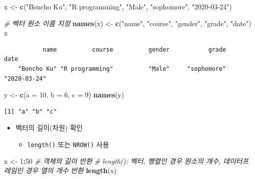 \documentclass[
  11pt,
]{krantz}
\newenvironment{Shaded}{\begin{snugshade}}{\end{snugshade}}
\newcommand{\CommentTok}[1]{\textcolor[rgb]{0.37,0.37,0.37}{\textit{#1}}}
\newcommand{\DataTypeTok}[1]{\textcolor[rgb]{0.27,0.27,0.27}{#1}}
\newcommand{\DecValTok}[1]{\textcolor[rgb]{0.06,0.06,0.06}{#1}}
\newcommand{\KeywordTok}[1]{\textcolor[rgb]{0.27,0.27,0.27}{\textbf{#1}}}
\newcommand{\NormalTok}[1]{#1}
\newcommand{\OperatorTok}[1]{\textcolor[rgb]{0.43,0.43,0.43}{\textbf{#1}}}
\newcommand{\StringTok}[1]{\textcolor[rgb]{0.5,0.5,0.5}{#1}}
\providecommand{\tightlist}{%
  \setlength{\itemsep}{0pt}\setlength{\parskip}{0pt}}
\begin{document}
\begin{Shaded}
\begin{Highlighting}[]
\NormalTok{x <-}\StringTok{ }\KeywordTok{c}\NormalTok{(}\StringTok{"Boncho Ku"}\NormalTok{, }\StringTok{"R programming"}\NormalTok{, }\StringTok{"Male"}\NormalTok{, }\StringTok{"sophomore"}\NormalTok{, }\StringTok{"2020-03-24"}\NormalTok{)}

\CommentTok{# 벡터 원소 이름 지정}
\KeywordTok{names}\NormalTok{(x) <-}\StringTok{ }\KeywordTok{c}\NormalTok{(}\StringTok{"name"}\NormalTok{, }\StringTok{"course"}\NormalTok{, }\StringTok{"gender"}\NormalTok{, }\StringTok{"grade"}\NormalTok{, }\StringTok{"date"}\NormalTok{) }
\NormalTok{x}
\end{Highlighting}
\end{Shaded}

\begin{verbatim}
           name          course          gender           grade            date 
    "Boncho Ku" "R programming"          "Male"     "sophomore"    "2020-03-24" 
\end{verbatim}

\begin{Shaded}
\begin{Highlighting}[]
\NormalTok{y <-}\StringTok{ }\KeywordTok{c}\NormalTok{(}\DataTypeTok{a =} \DecValTok{10}\NormalTok{, }\DataTypeTok{b =} \DecValTok{6}\NormalTok{, }\DataTypeTok{c =} \DecValTok{9}\NormalTok{)}
\KeywordTok{names}\NormalTok{(y)}
\end{Highlighting}
\end{Shaded}

\begin{verbatim}
[1] "a" "b" "c"
\end{verbatim}

\normalsize

\begin{itemize}
\tightlist
\item
  벡터의 길이(차원) 확인

  \begin{itemize}
  \tightlist
  \item
    \texttt{length()} 또는 \texttt{NROW()} 사용
  \end{itemize}
\end{itemize}

\footnotesize

\begin{Shaded}
\begin{Highlighting}[]
\NormalTok{x <-}\StringTok{ }\DecValTok{1}\OperatorTok{:}\DecValTok{50}
\CommentTok{# 객체의 길이 반환}
\CommentTok{# length(): 벡터, 행렬인 경우 원소의 개수, 데이터프레임인 경우 열의 개수 반환}
\KeywordTok{length}\NormalTok{(x) }
\end{Highlighting}
\end{Shaded}
\end{document}
